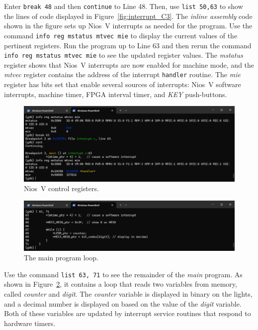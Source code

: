 \documentclass[11pt, twoside, pdftex]{article}
\newcommand{\red}[1]{{\color{red}\sf{#1}}}
\begin{document}
Enter \texttt{break 48} and then \texttt{continue} to Line 48. Then, use \texttt{list 50,63}
to show the lines of code displayed in Figure~\ref{fig:interrupt_C3}. The {\it inline
assembly} code shown in the figure sets up Nios~V interrupts as needed for the program.
Use the command \texttt{info reg mstatus mtvec mie} to display the current values of the
pertinent registers. Run the program up to Line 63 and then rerun the command
\texttt{info reg mstatus mtvec mie} to see the updated register values. The {\it mstatus}
register shows that Nios~V interrupts are now enabled for machine mode, and the {\it mtvec}
register contains the address of the interrupt \texttt{handler} routine. The {\it mie}
register has bits set that enable several sources of interrupts: Nios~V software interrupts, 
machine timer, FPGA interval timer, and {\it KEY} push-buttons.

\begin{figure}[h]
    \begin{center}
        \includegraphics[scale=.6]{figures/interrupt_C4.png}
        \caption{Nios~V control registers.}
        \label{fig:interrupt_C4}
    \end{center}
\end{figure}

\begin{figure}[h]
    \begin{center}
        \includegraphics[scale=.6]{figures/interrupt_C5.png}
        \caption{The main program loop.}
        \label{fig:interrupt_C5}
    \end{center}
\end{figure}

Use the command \texttt{list 63, 71} to see the remainder of the {\it main} program. As shown in
Figure~\ref{fig:interrupt_C5}, it contains a 
loop that reads two variables from memory, called {\it counter} and {\it digit}.  The
{\it counter} variable is displayed in binary on the \red{{\it LEDR}} lights, and a decimal 
number is displayed on \red{{\it HEX0}} based on the value of the {\it digit} variable.
Both of these variables are updated by interrupt service routines that respond to hardware 
timers.
\end{document}
